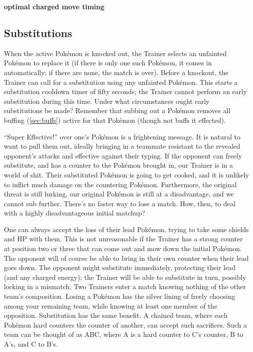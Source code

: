 \textbf{optimal charged move timing}

\subsection{Substitutions\label{subsec:substitutions}}
When the active Pokémon is knocked out, the Trainer selects an unfainted
  Pokémon to replace it (if there is only one such Pokémon, it comes in
  automatically; if there are none, the match is over).
Before a knockout, the Trainer can call for a substitution using any
  unfainted Pokémon.
This starts a substitution cooldown timer of fifty seconds; the Trainer
  cannot perform an early substitution during this time.
Under what circumstances ought early substitutions be made?
Remember that subbing out a Pokémon removes all buffing (\autoref{sec:buffs})
  active for that Pokémon (though not buffs it effected).

``Super Effective!'' over one's Pokémon is a frightening message.
It is natural to want to pull them out, ideally bringing in a teammate resistant
  to the revealed opponent's attacks and effective against their typing.
If the opponent can freely substitute, and has a counter to the Pokémon brought in,
  our Trainer is in a world of shit.
Their substituted Pokémon is going to get cooked, and it is unlikely to inflict much damage on the countering Pokémon.
Furthermore, the original threat is still lurking, our original Pokémon is still at a disadvantage,
 and we cannot sub further.
There's no faster way to lose a match.
How, then, to deal with a highly disadvantageous initial matchup?

One can always accept the loss of their lead Pokémon, trying to take some shields and HP with them.
This is not unreasonable if the Trainer has a strong counter at position two or three
  that can come out and mow down the initial Pokémon.
The opponent will of course be able to bring in their own counter when their lead goes down.
The opponent might substitute immediately, protecting their lead (and any charged energy); the Trainer will be able to substitute in turn, possibly locking in a mismatch.
Two Trainers enter a match knowing nothing of the other team's composition.
Losing a Pokémon has the silver lining of freely choosing among your remaining team,
  while knowing at least one member of the opposition.
Substitution has the same benefit.
A chained team, where each Pokémon hard counters the counter of another, can accept such sacrifices.
Such a team can be thought of as ABC, where A is a hard counter to C's counter, B to A's, and C to B's.

